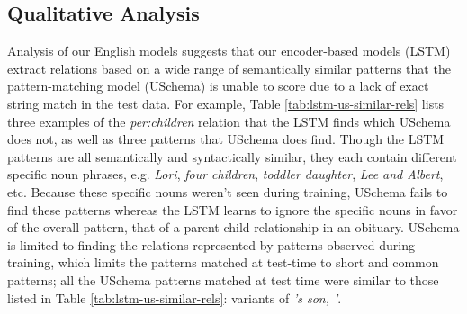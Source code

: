 \subsection{Qualitative Analysis \label{sec:qual-anal}}

Analysis of our English models suggests that our encoder-based models (LSTM) extract relations based on a wide range of semantically similar patterns that the pattern-matching model (USchema) is unable to score due to a lack of exact string match in the test data. For example, Table \ref{tab:lstm-us-similar-rels} lists three examples of the \emph{per:children} relation that the LSTM finds which USchema does not, as well as three patterns that USchema does find. Though the LSTM patterns are all semantically and syntactically similar, they each contain different specific noun phrases, e.g. \emph{Lori}, \emph{four children}, \emph{toddler daughter}, \emph{Lee and Albert}, etc. Because these specific nouns weren't seen during training, USchema fails to find these patterns whereas the LSTM learns to ignore the specific nouns in favor of the overall pattern, that of a parent-child relationship in an obituary. USchema is limited to finding the relations represented by patterns observed during training, which limits the patterns matched at test-time to short and common patterns; all the USchema patterns matched at test time were similar to those listed in Table \ref{tab:lstm-us-similar-rels}: variants of \emph{'s son, '}. 


